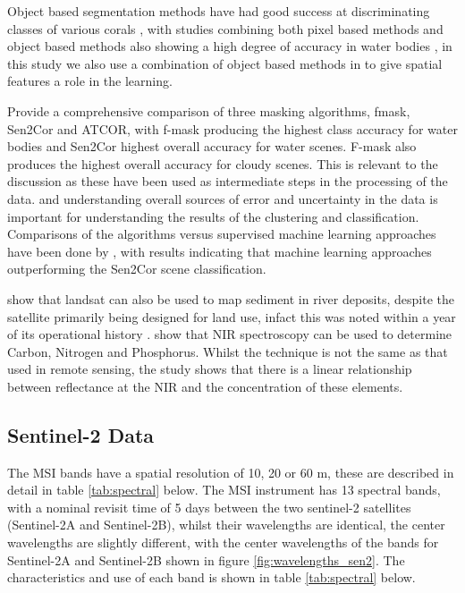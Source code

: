 \documentclass[journal,article,submit,pdftex,moreauthors]{Definitions/mdpi}
\begin{document}
Object based segmentation methods have had good success at discriminating classes of various corals \cite{Nguyen2021}, with studies combining both pixel based methods and object based methods 
also showing a high degree of accuracy in water bodies \cite{huang2015combining}, in this study we also use a combination of object based methods in to give spatial features a role in the learning.


\cite{zekoll2021comparison} Provide a comprehensive comparison of three masking algorithms, fmask, Sen2Cor and ATCOR, with f-mask producing the highest class accuracy for water bodies and Sen2Cor 
highest overall accuracy for water scenes. F-mask also produces the highest overall accuracy for cloudy scenes. This is relevant to the discussion as these have been used as intermediate steps in the processing of the data.
and understanding overall sources of error and uncertainty in the data is important for understanding the results of the clustering and classification. Comparisons of the algorithms versus supervised machine learning approaches have been
done by \cite{raiyani2021sentinel}, with results indicating that machine learning approaches outperforming the Sen2Cor scene classification.


\cite{ZHANG2014136} show that landsat can also be used to map sediment in river deposits, despite the satellite primarily being designed for land use, infact this was noted within a year of its operational history \cite{caballero2018evaluation}. \cite{Malley_NIR_Spectroscopy} show that NIR spectroscopy can be used to determine Carbon, Nitrogen and 
Phosphorus. Whilst the technique is not the same as that used in remote sensing, the study shows that there is a linear relationship between reflectance at the NIR and the concentration of these elements. 




\subsection*{Sentinel-2 Data}
The MSI bands have a spatial resolution of 10, 20 or 60 m, these are described in detail in table \ref{tab:spectral} below. The MSI instrument has 13 spectral bands, with a nominal revisit time of 5 days between the two 
sentinel-2 satellites (Sentinel-2A and Sentinel-2B), whilst their wavelengths are identical, the center wavelengths are slightly different, with the center wavelengths of the bands for Sentinel-2A and Sentinel-2B shown in figure \ref{fig:wavelengths_sen2}. 
The characteristics and use of each band is shown in table \ref{tab:spectral} below.
\end{document}
